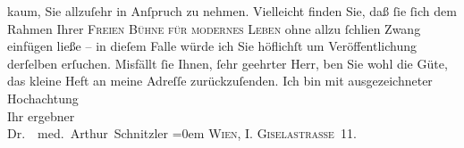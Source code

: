 \begin{ledgroupsized}[t]{13cm}
               kaum, Sie allzuſehr in Anſpruch zu nehmen. Vielleicht finden Sie, daß ſie ſich dem
               Rahmen Ihrer \textsc{Freien Bühne für modernes Leben} ohne allzu ſchli{\geminationm}en Zwang einfügen ließe – in
               dieſem Falle würde ich Sie höflichſt um Veröffentlichung derſelben erſuchen. Misfällt
               ſie Ihnen, ſehr geehrter Herr, {\pb}ben Sie wohl die Güte, das kleine Heft an meine Adreſſe zurückzuſenden.\pend
           \pstart
           Ich bin mit ausgezeichneter Hochachtung{\\[\baselineskip]}Ihr ergebner{\\[\baselineskip]}\spacefill\mbox{Dr.  med. Arthur Schnitzler}\pend
           \leftskip=0em{}\pstart
           \noindent{}\textsc{Wien, I. Giselastraße 11.}\pend
           
         
         \endnumbering{}\end{ledgroupsized}  \newcommand{\dateiname}{L00005}\newcommand{\titel}{Arthur Schnitzler an Wilhelm Bölsche, [Anfang September] 1890}\newcommand{\editorInnen}{Martin Anton Müller und Gerd-Hermann Susen}
      